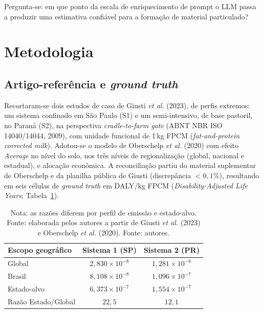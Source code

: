 \documentclass[12pt,a4paper]{article}
\begin{document}
Pergunta-se: em que ponto da escala de enriquecimento de prompt o LLM passa a produzir uma estimativa confiável para a formação de material particulado?

\section{Metodologia}

\subsection{Artigo-referência e \textit{ground truth}}

Recortaram-se dois estudos de caso de Giusti \emph{et al.} (2023), de perfis extremos: um sistema confinado em São Paulo (S1) e um semi-intensivo, de base pastoril, no Paraná (S2), na perspectiva \emph{cradle-to-farm gate} (ABNT NBR ISO 14040/14044, 2009), com unidade funcional de 1\,kg FPCM (\emph{fat-and-protein corrected milk}). Adotou-se o modelo de Oberschelp \emph{et al.} (2020) com efeito \textit{Average} no nível do solo, nos três níveis de regionalização (global, nacional e estadual), e alocação econômica. A reconciliação partiu do material suplementar de Oberschelp e da planilha pública de Giusti (discrepância $<0{,}1\%$), resultando em seis células de \emph{ground truth} em DALY/kg FPCM (\emph{Disability-Adjusted Life Years}; Tabela~\ref{tab:gt}).

\begin{table}[h]
\centering
\caption{\emph{Ground truth} --- Oberschelp \textit{et al.} (2020) \textit{Average}, alocação econômica}
\label{tab:gt}
\begin{tabular}{lcc}
\toprule
\textbf{Escopo geográfico} & \textbf{Sistema 1 (SP)} & \textbf{Sistema 2 (PR)} \\
\midrule
Global         & $2{,}830 \times 10^{-8}$ & $1{,}281 \times 10^{-8}$ \\
Brasil         & $8{,}108 \times 10^{-8}$ & $1{,}096 \times 10^{-7}$ \\
Estado-alvo    & $6{,}373 \times 10^{-7}$ & $1{,}554 \times 10^{-7}$ \\
\midrule
Razão Estado/Global & $22{,}5$ & $12{,}1$ \\
\bottomrule
\end{tabular}
\caption*{\footnotesize Nota: as razões diferem por perfil de emissão e estado-alvo. Fonte: elaborada pelos autores a partir de Giusti \emph{et al.} (2023) e Oberschelp \emph{et al.} (2020). Fonte: autores.}
\end{table}
\end{document}
